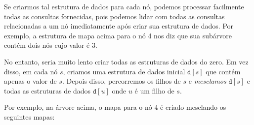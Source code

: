 \begin{center}
\end{center}

Se criarmos tal estrutura de dados para cada nó, podemos processar facilmente todas as consultas fornecidas, pois podemos lidar com todas as consultas relacionadas a um nó imediatamente após criar sua estrutura de dados. Por exemplo, a estrutura de mapa acima para o nó 4 nos diz que sua subárvore contém dois nós cujo valor é 3.

No entanto, seria muito lento criar todas as estruturas de dados do zero. Em vez disso, em cada nó $s$, criamos uma estrutura de dados inicial $\texttt{d}[s]$ que contém apenas o valor de $s$. Depois disso, percorremos os filhos de $s$ e \emph{mesclamos} $\texttt{d}[s]$ e todas as estruturas de dados $\texttt{d}[u]$ onde $u$ é um filho de $s$.

Por exemplo, na árvore acima, o mapa para o nó $4$ é criado mesclando os seguintes mapas:

